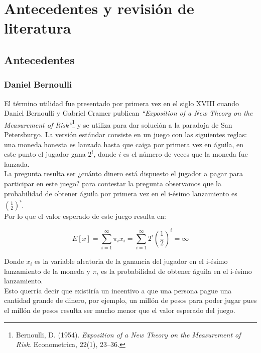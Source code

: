 \chapter{Antecedentes y revisión de literatura}


\section{Antecedentes}

\subsection{Daniel Bernoulli}

El término utilidad fue presentado por primera vez en el siglo XVIII cuando Daniel Bernoulli y Gabriel Cramer publican \textit{“Exposition of a New Theory on the Measurement of Risk”}\footnote{Bernoulli, D. (1954). \textit{Exposition of a New Theory on the Measurement of Risk}. Econometrica, 22(1), 23–36.} y se utiliza para dar solución a la paradoja de San Petersburgo. La versión estándar consiste en un juego con las siguientes reglas: una moneda honesta es lanzada hasta que caiga por primera vez en águila, en este punto el jugador gana $2^i$, donde $i$ es el número de veces que la moneda fue lanzada. \\

La pregunta resulta ser ¿cuánto dinero está dispuesto el jugador a pagar para participar en este juego? para contestar la pregunta observamos que la probabilidad de obtener águila por primera vez en el i-ésimo lanzamiento es $(\frac{1}{2})^i$. \\

Por lo que el valor esperado de este juego resulta en: 

\begin{equation}
E[x] = \sum_{i = 1} ^{\infty} \pi_i x_i = \sum_{i = 1} ^{\infty} 2^i (\frac{1}{2})^i = \infty 
\end{equation}

Donde $x_i$ es la variable aleatoria de la ganancia del jugador en el i-ésimo lanzamiento de la moneda y $\pi_i$ es la probabilidad de obtener águila en el i-ésimo lanzamiento. \\

Esto querría decir que existiría un incentivo a que una persona pague una cantidad grande de dinero, por ejemplo, un millón de pesos para poder jugar pues el millón de pesos resulta ser mucho menor que el valor esperado del juego.\\

